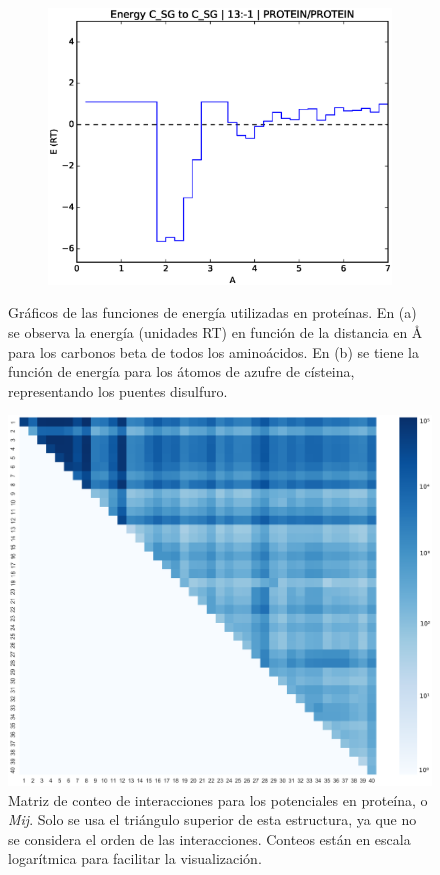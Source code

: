 \begin{figure}[p]
\begin{subfigure}{.8\textwidth}
\centering
\includegraphics[width=\textwidth]{figures/prot_pot/eps_graphs/sh2sh.eps}
\caption{}
\end{subfigure}
\caption[Ejemplos de funciones de energía en proteínas]{Gráficos de las funciones de energía utilizadas en proteínas. 
En (a) se observa la energía (unidades RT) en función de la distancia en \si{\angstrom} para los carbonos beta de todos los aminoácidos. 
En (b) se tiene la función de energía para los átomos de azufre de císteina, representando los puentes disulfuro.}
\label{fig:energy1}
\end{figure}

\begin{figure}[p]
\includegraphics[width=\textwidth]{figures/prot_pot/mij.png}
\caption[Cálculo de $\sigma$]{Matriz de conteo de interacciones para los potenciales en proteína, o \textit{Mij}. 
Solo se usa el triángulo superior de esta estructura, ya que no se considera el orden de las interacciones. 
Conteos están en escala logarítmica para facilitar la visualización.}
\label{fig:mij}
\end{figure}
\cleardoublepage

